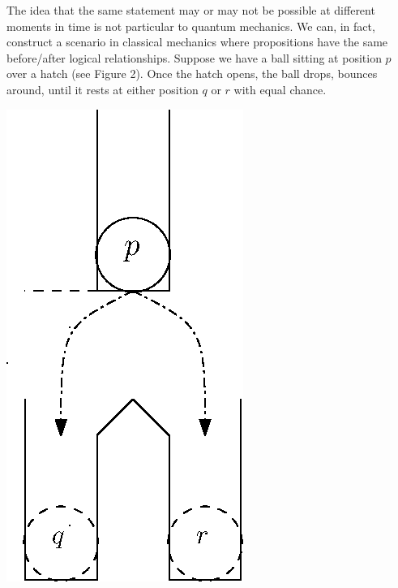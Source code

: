 \documentclass[11pt, executivepaper]{article}
\begin{document}
The idea that the same statement may or may not be possible at different moments in time is not particular to quantum mechanics. We can, in fact, construct a scenario in classical mechanics where propositions have the same before/after logical relationships. Suppose we have a ball sitting at position $p$ over a hatch (see Figure 2). Once the hatch opens, the ball drops, bounces around, until it rests at either position $q$ or $r$ with equal chance.

\begin{center}
\includegraphics[scale=.8]{Ball.eps}
\end{center}
\end{document}
